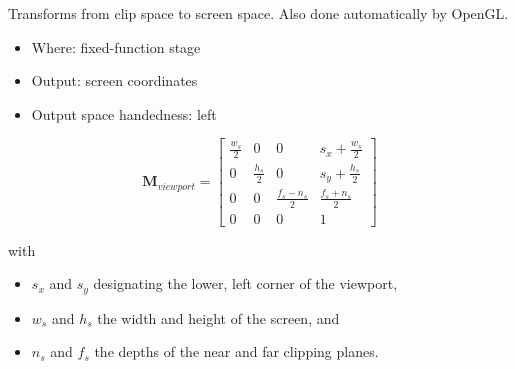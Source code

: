 \documentclass{scrartcl}
\begin{document}
    Transforms from clip space to screen space. Also done automatically by OpenGL.
        
    \begin{itemize}
        \item Where: fixed-function stage
        \item Output: screen coordinates
         \item Output space handedness: left
    \end{itemize}
    
    \[
    \mathbf{M}_{viewport} =
    \begin{bmatrix}
        \frac{w_s}{2} & 0 & 0 & s_x + \frac{w_s}{2} \\
        0 & \frac{h_s}{2} & 0 & s_y + \frac{h_s}{2} \\
        0 & 0 & \frac{f_s - n_s}{2} & \frac{f_s + n_s}{2} \\
        0 & 0 & 0 & 1 
    \end{bmatrix}
    \]
    
    with
    \begin{itemize}
        \item $s_x$ and $s_y$ designating the lower, left corner of the viewport,
        \item $w_s$ and $h_s$ the width and height of the screen, and
        \item $n_s$ and $f_s$ the depths of the near and far clipping planes.
    \end{itemize}
    
\end{document}
